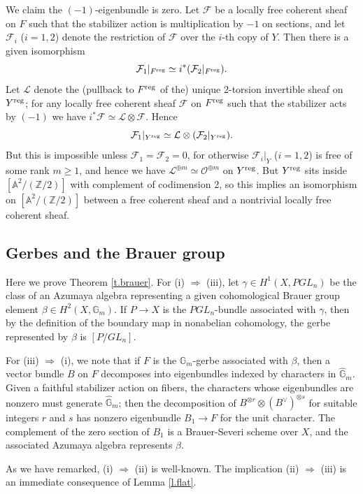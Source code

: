 \documentclass[12pt]{amsart}
\newcommand{\Z}{{\mathbb Z}}
\newcommand{\G}{{\mathbb G}}
\newcommand{\A}{{\mathbb A}}
\theoremstyle{plain}
\theoremstyle{definition}
\theoremstyle{remark}
\begin{document}
We claim the $(-1)$-eigenbundle is zero.
Let ${\mathcal F}$ be a locally free coherent sheaf on $F$ such that the
stabilizer action is multiplication by $-1$ on sections,
and let ${\mathcal F}_i$ ($i=1, 2$) denote the restriction of ${\mathcal F}$
over the $i$-th copy of $Y$.
Then there is a given isomorphism
$${\mathcal F}_1|_{F^{\rm reg}}\simeq i^*({\mathcal F}_2|_{F^{\rm reg}}).$$
Let ${\mathcal L}$ denote the (pullback to $F^{\rm reg}$ of the) 
unique 2-torsion invertible sheaf on $Y^{\rm reg}$;
for any locally free coherent sheaf ${\mathcal F}$ on $F^{\rm reg}$ such that
the stabilizer acts by $(-1)$ we have
$i^*{\mathcal F}\simeq
{\mathcal L}\otimes {\mathcal F}$.
Hence $${\mathcal F}_1|_{Y^{\rm reg}}\simeq
{\mathcal L}\otimes ({\mathcal F}_2|_{Y^{\rm reg}}).$$
But this is impossible unless ${\mathcal F}_1={\mathcal F}_2=0$,
for otherwise ${\mathcal F}_i|_Y$ ($i=1,2$) is free of some rank $m\ge 1$,
and hence we have ${\mathcal L}^{\oplus m}\simeq {\mathcal O}^{\oplus m}$
on $Y^{\rm reg}$.  But $Y^{\rm reg}$ sits inside $[\A^2/(\Z/2)]$ with
complement of codimension 2,
so this implies an isomorphism
on $[\A^2/(\Z/2)]$ between a
free coherent sheaf and a nontrivial locally free coherent sheaf.

\subsection{Gerbes and the Brauer group}
Here we prove Theorem \ref{t.brauer}.
For (i) $\Rightarrow$ (iii),
let $\gamma\in H^1(X,PGL_n)$ be the class of an Azumaya algebra
representing a given cohomological Brauer group element
$\beta\in H^2(X,\G_m)$.
If $P\to X$ is the $PGL_n$-bundle associated with $\gamma$,
then by the definition of the boundary map in nonabelian cohomology,
the gerbe represented by $\beta$ is $[P/GL_n]$.

For (iii) $\Rightarrow$ (i), we note that if $F$ is the $\G_m$-gerbe
associated with $\beta$, then a vector bundle $B$ on $F$ decomposes into
eigenbundles indexed by characters in $\widehat \G_m$.
Given a faithful stabilizer action on fibers, the characters whose
eigenbundles are nonzero must generate $\widehat \G_m$;
then the decomposition of $B^{\otimes r}\otimes (B^\vee)^{\otimes s}$
for suitable integers $r$ and $s$ has nonzero eigenbundle $B_1\to F$
for the unit character.
The complement of the zero section of $B_1$ is a
Brauer-Severi scheme over $X$,
and the associated Azumaya algebra represents $\beta$.

As we have remarked, (i) $\Rightarrow$ (ii) is well-known.
The implication (ii) $\Rightarrow$ (iii) is an immediate consequence
of Lemma \ref{l.flat}.
\end{document}
